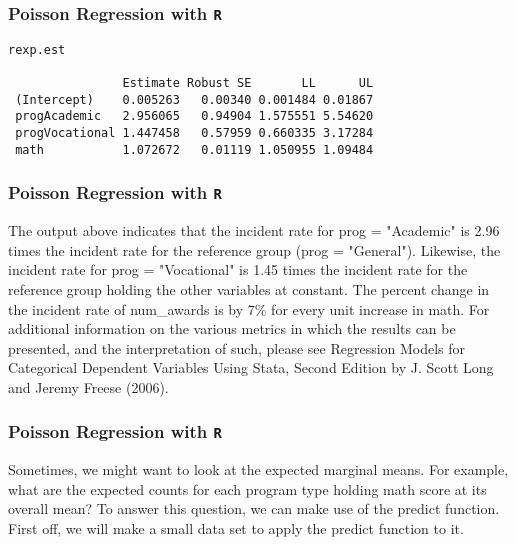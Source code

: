 \documentclass[00-GLMregslides.tex]{subfiles}
\begin{document}
\begin{frame}[fragile]

\frametitle{Poisson Regression with \texttt{R}}
\Large

\begin{framed}
\begin{verbatim}
rexp.est
 
                Estimate Robust SE       LL      UL
 (Intercept)    0.005263   0.00340 0.001484 0.01867
 progAcademic   2.956065   0.94904 1.575551 5.54620
 progVocational 1.447458   0.57959 0.660335 3.17284
 math           1.072672   0.01119 1.050955 1.09484
\end{verbatim}
\end{framed}
\end{frame}
\begin{frame}[fragile]

\frametitle{Poisson Regression with \texttt{R}}
\Large 
The output above indicates that the incident rate for prog = "Academic" is 2.96 times the incident rate for the reference group (prog = "General"). Likewise, the incident rate for prog = "Vocational" is 1.45 times the incident rate for the reference group holding the other variables at constant. The percent change in the incident rate of num\_awards is by 7\% for every unit increase in math. For additional information on the various metrics in which the results can be presented, and the interpretation of such, please see Regression Models for Categorical Dependent Variables Using Stata, Second Edition by J. Scott Long and Jeremy Freese (2006).
\end{frame}

\begin{frame}[fragile]

\frametitle{Poisson Regression with \texttt{R}}
\Large
Sometimes, we might want to look at the expected marginal means. For example, what are the expected counts for each program type holding math score at its overall mean? To answer this question, we can make use of the predict function. First off, we will make a small data set to apply the predict function to it.


\end{frame}
\end{document}
